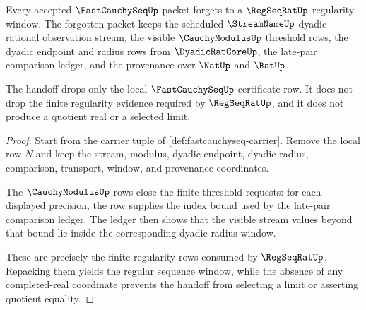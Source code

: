 \begin{theorem}
\label{thm:fastcauchyseq-regseqrat-forgetful-handoff}
Every accepted $\FastCauchySeqUp$ packet forgets to a $\RegSeqRatUp$ regularity window. The forgotten packet keeps the scheduled $\StreamNameUp$ dyadic-rational observation stream, the visible $\CauchyModulusUp$ threshold rows, the dyadic endpoint and radius rows from $\DyadicRatCoreUp$, the late-pair comparison ledger, and the provenance over $\NatUp$ and $\RatUp$.

The handoff drops only the local $\FastCauchySeqUp$ certificate row. It does not drop the finite regularity evidence required by $\RegSeqRatUp$, and it does not produce a quotient real or a selected limit.
\end{theorem}
\begin{proof}
Start from the carrier tuple of \autoref{def:fastcauchyseq-carrier}. Remove the local row $N$ and keep the stream, modulus, dyadic endpoint, dyadic radius, comparison, transport, window, and provenance coordinates.

The $\CauchyModulusUp$ rows close the finite threshold requests: for each displayed precision, the row supplies the index bound used by the late-pair comparison ledger. The ledger then shows that the visible stream values beyond that bound lie inside the corresponding dyadic radius window.

These are precisely the finite regularity rows consumed by $\RegSeqRatUp$. Repacking them yields the regular sequence window, while the absence of any completed-real coordinate prevents the handoff from selecting a limit or asserting quotient equality.
\end{proof}

